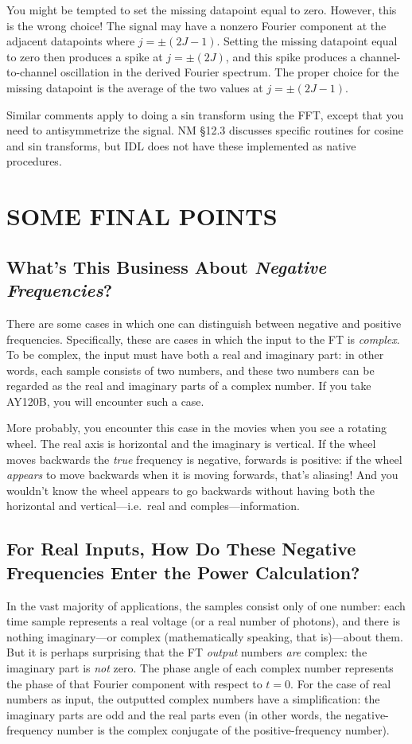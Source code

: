 \documentclass[psfig,preprint]{aastex}
\begin{document}
	You might be tempted to set the missing datapoint equal to
zero. However, this is the wrong choice! The signal may have a nonzero
Fourier component at the adjacent datapoints where $j = \pm (2J-1)$.
Setting the missing datapoint equal to zero then produces a spike at $j =
\pm (2J)$, and this spike produces a channel-to-channel oscillation in
the derived Fourier spectrum. The proper choice for the missing datapoint
is the average of the two values at $j = \pm (2J-1)$.

	Similar comments apply to doing a sin transform using the FFT,
except that you need to antisymmetrize the signal. NM \S 12.3 discusses
specific routines for cosine and sin transforms, but IDL does not have
these implemented as native procedures.

\section{SOME FINAL POINTS}

\subsection{What's This Business About {\it Negative Frequencies}?}

          There are some cases in which one can distinguish between
negative and positive frequencies. Specifically, these are cases in
which the input to the FT is {\it complex}. To be complex, the input
must have both a real and imaginary part: in other words, each sample
consists of two numbers, and these two numbers can be regarded as the
real and imaginary parts of a complex number. If you take AY120B, you
will encounter such a case. 

	More probably, you encounter this case in the movies when you
see a rotating wheel. The real axis is horizontal and the imaginary is
vertical. If the wheel moves backwards the {\it true} frequency is
negative, forwards is positive: if the wheel {\it appears} to move
backwards when it is moving forwards, that's aliasing! And you wouldn't
know the wheel appears to go backwards without having both the
horizontal and vertical---i.e.\ real and comples---information.

\subsection{For Real Inputs, How Do These Negative Frequencies Enter the
Power Calculation?}

          In the vast majority of applications, the samples consist
only of one number: each time sample represents
a real voltage (or a real number of photons), and there is nothing
imaginary---or complex (mathematically speaking, that is)---about them. 
But it is perhaps surprising that the FT {\it output} numbers {\it are}
complex: the imaginary part is {\it not} zero.  The phase angle of each
complex number represents the phase of that Fourier component with
respect to $t=0$.  For the case of real numbers as input, the outputted
complex numbers have a simplification: the imaginary parts are odd and
the real parts even (in other words, the negative-frequency number is
the complex conjugate of the positive-frequency number). 
\end{document}
